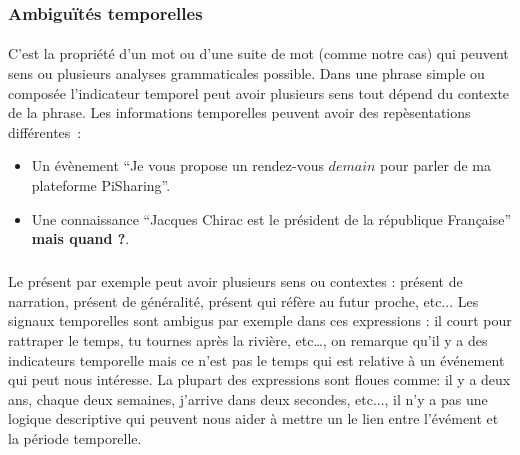 \documentclass[12pt,a4	]{report}
\begin{document}
\subsubsection*{Ambiguïtés temporelles}
\paragraph{}
C'est la propriété d'un mot ou d'une suite de mot (comme notre cas) qui peuvent sens ou plusieurs analyses grammaticales possible. Dans une phrase simple ou composée l'indicateur temporel peut avoir plusieurs sens tout dépend du contexte de la phrase.
\newline
Les informations temporelles peuvent avoir des repèsentations différentes~: 
\begin{itemize}
\item Un évènement ``Je vous propose un rendez-vous $demain$ pour parler de ma plateforme PiSharing''. \item Une connaissance ``Jacques Chirac est le président de la république Française'' \textbf{ mais quand ?}.
\end{itemize}

\subparagraph{} 
Le présent par exemple peut avoir plusieurs sens ou contextes : présent de narration, présent de généralité, présent qui réfère au futur proche, etc...
Les signaux temporelles sont ambigus par exemple dans ces expressions : il court pour rattraper le temps, tu tournes après la rivière, etc…, on remarque qu'il y a des indicateurs temporelle mais ce n'est pas le temps qui est relative à un événement qui peut nous intéresse.
La plupart des expressions sont floues comme: il y a deux ans, chaque deux semaines, j’arrive dans deux secondes, etc..., il n'y a pas une logique descriptive qui peuvent nous aider à mettre un le lien entre l'évément et la période temporelle.
\end{document}
